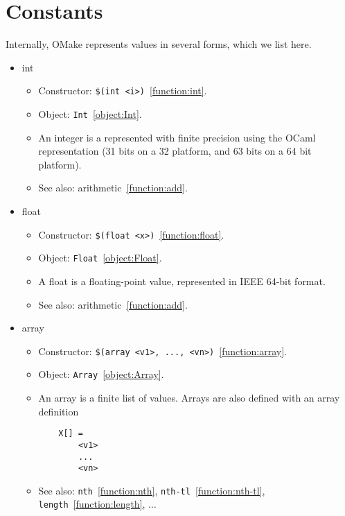\section{Constants}

Internally, OMake represents values in several forms, which we list here.

\begin{itemize}
\item int

\begin{itemize}
\item Constructor: \verb+$(int <i>)+~\ref{function:int}.
\item Object: \verb+Int+~\ref{object:Int}.
\item An integer is a represented with finite precision using the OCaml representation (31 bits on a
  32 platform, and 63 bits on a 64 bit platform).
\item See also: arithmetic~\ref{function:add}.
\end{itemize}

\item float

\begin{itemize}
\item Constructor: \verb+$(float <x>)+~\ref{function:float}.
\item Object: \verb+Float+~\ref{object:Float}.
\item A float is a floating-point value, represented in IEEE 64-bit format.
\item See also: arithmetic~\ref{function:add}.
\end{itemize}

\item array

\begin{itemize}
\item Constructor: \verb+$(array <v1>, ..., <vn>)+~\ref{function:array}.
\item Object: \verb+Array+~\ref{object:Array}.
\item An array is a finite list of values.
  Arrays are also defined with an array definition
\begin{verbatim}
    X[] =
        <v1>
        ...
        <vn>
\end{verbatim}
\item See also: \verb+nth+~\ref{function:nth}, \verb+nth-tl+~\ref{function:nth-tl},
  \verb+length+~\ref{function:length}, $\ldots$
\end{itemize}


\end{itemize}
